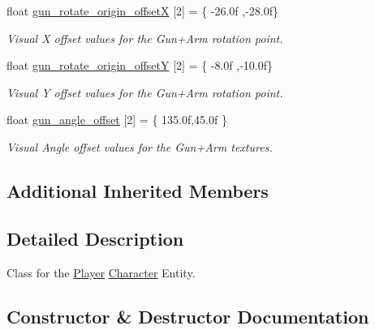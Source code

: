 \begin{DoxyCompactItemize}
$$float \mbox{\hyperlink{class_player_a38dcaae6da74808d5d5de0def67abc9f}{gun\+\_\+rotate\+\_\+origin\+\_\+offsetX}} \mbox{[}2\mbox{]} = \{ -\/26.\+0f ,-\/28.\+0f\}
\begin{DoxyCompactList}\small\item\em Visual X offset values for the Gun+\+Arm rotation point. \end{DoxyCompactList}\item 
\mbox{\label{class_player_a091b93fd7e3aac5ed35c06819e495be1}} 
float \mbox{\hyperlink{class_player_a091b93fd7e3aac5ed35c06819e495be1}{gun\+\_\+rotate\+\_\+origin\+\_\+offsetY}} \mbox{[}2\mbox{]} = \{ -\/8.\+0f ,-\/10.\+0f\}
\begin{DoxyCompactList}\small\item\em Visual Y offset values for the Gun+\+Arm rotation point. \end{DoxyCompactList}\item 
\mbox{\label{class_player_ab407fa97dd63740433e0039f059efc70}} 
float \mbox{\hyperlink{class_player_ab407fa97dd63740433e0039f059efc70}{gun\+\_\+angle\+\_\+offset}} \mbox{[}2\mbox{]} = \{ 135.\+0f,45.\+0f \}
\begin{DoxyCompactList}\small\item\em Visual Angle offset values for the Gun+\+Arm textures. \end{DoxyCompactList}\end{DoxyCompactItemize}
\subsection*{Additional Inherited Members}


\subsection{Detailed Description}
Class for the \mbox{\hyperlink{class_player}{Player}} \mbox{\hyperlink{class_character}{Character}} Entity. 

\subsection{Constructor \& Destructor Documentation}
\mbox{\label{class_player_a1f51378f8330bc3f145f951dfdd9cabd}} 
